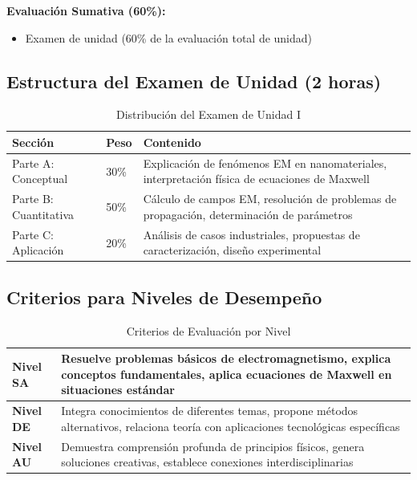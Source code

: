 \begin{tecnologiabox}
\begin{tecnologiabox}
\begin{tecnologiabox}
\begin{teknologiabox}
\begin{evaluacionbox}
\textbf{Evaluación Sumativa (60\%):}
\begin{itemize}
\item Examen de unidad (60\% de la evaluación total de unidad)
\end{itemize}
\end{evaluacionbox}

\subsection{Estructura del Examen de Unidad (2 horas)}

\begin{table}[h]
\centering
\caption{Distribución del Examen de Unidad I}
\begin{tabular}{|L{4cm}|C{2cm}|L{6cm}|}
\hline
{}
\textbf{Sección} & \textbf{Peso} & \textbf{Contenido} \\
\hline
Parte A: Conceptual & 30\% & Explicación de fenómenos EM en nanomateriales, interpretación física de ecuaciones de Maxwell \\
\hline
Parte B: Cuantitativa & 50\% & Cálculo de campos EM, resolución de problemas de propagación, determinación de parámetros \\
\hline
Parte C: Aplicación & 20\% & Análisis de casos industriales, propuestas de caracterización, diseño experimental \\
\hline
\end{tabular}
\end{table}

\subsection{Criterios para Niveles de Desempeño}

\begin{table}[h]
\centering
\caption{Criterios de Evaluación por Nivel}
\begin{tabular}{|C{2cm}|L{10cm}|}
\hline
{}
\textbf{Nivel SA} & Resuelve problemas básicos de electromagnetismo, explica conceptos fundamentales, aplica ecuaciones de Maxwell en situaciones estándar \\
\hline
{}
\textbf{Nivel DE} & Integra conocimientos de diferentes temas, propone métodos alternativos, relaciona teoría con aplicaciones tecnológicas específicas \\
\hline
{}
\textbf{Nivel AU} & Demuestra comprensión profunda de principios físicos, genera soluciones creativas, establece conexiones interdisciplinarias \\
\hline
\end{tabular}
\end{table}


\end{teknologiabox}
\end{tecnologiabox}
\end{tecnologiabox}
\end{tecnologiabox}
